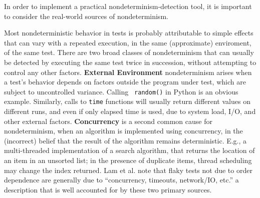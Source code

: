 In order to implement a practical nondeterminism-detection tool, it is
important to consider the real-world sources of nondeterminism.  

Most nondeterministic behavior in tests is probably attributable to simple
effects that can vary with a repeated execution, in the same
(approximate) enviroment, of the same test.  There are two broad classes of
nondeterminism that can usually be detected by
executing the same test twice in succession, without attempting
to control any other factors.  {\bf External Environment} nondeterminism arises
  when a test's behavior depends on factors outside the program under
  test, which are subject to uncontrolled variance.  Calling {\tt
    random()} in Python is an obvious example. Similarly, calls to {\tt time}
  functions  will usually return different values on different runs,
  and even if only elapsed time is used, due to system load, I/O, and
  other external factors.  {\bf Concurrency} is a second common cause for
  nondeterminism, when an algorithm is implemented using
  concurrency, in the (incorrect) belief that the result of the
  algorithm remains deterministic.  E.g., a multi-threaded
  implementation of a search algorithm, that returns the location of
  an item in an unsorted list; in the presence of duplicate items,
  thread scheduling may change the index returned.  Lam et al. \cite{idflakies} note that flaky tests not due to order
dependence are generally due to ``concurrency, timeouts,
network/IO, etc.'' a description that is well accounted for by these two
primary sources.

